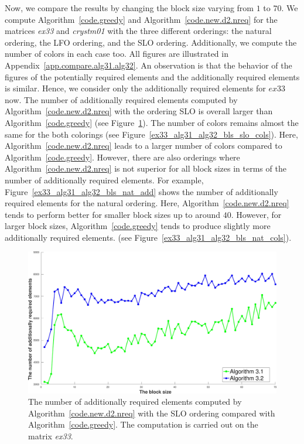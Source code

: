 \documentclass[12pt, twoside,a4paper,toc=bibliography]{scrbook}
\newcommand{\figref}[1]{Figure~\protect\ref{#1}}
\newcommand{\coderef}[1]{Algorithm~\protect\ref{#1}}
\newcommand{\appref}[1]{Appendix~\protect\ref{#1}}
\begin{document}
Now, we compare the results by changing the block size varying from $1$ to $70$.
We compute \coderef{code.greedy} and \coderef{code.new.d2.nreq} for the matrices \textit{ex33}
and \textit{crystm01} with the three different orderings: the natural ordering, the LFO ordering,
and the SLO ordering. Additionally, we compute the number of colors in each case too.
All figures are illustrated in \appref{app.compare.alg31.alg32}.
An observation is that the behavior of the figures of the potentially required elements and
the additionally required elements is similar. Hence, we consider only the additionally
required elements for $ex33$ now.
The number of additionally required elements computed by \coderef{code.new.d2.nreq} with the ordering SLO
is overall larger than \coderef{code.greedy} (see \figref{ex33_alg31_alg32_bls_slo_add}).
The number of colors remains almost the same for the both colorings
(see \figref{ex33_alg31_alg32_bls_slo_cols}).
Here, \coderef{code.new.d2.nreq} leads to a larger number of colors compared to \coderef{code.greedy}.
However, there are also orderings where \coderef{code.new.d2.nreq} is not superior for all block sizes in terms of 
the number of additionally required elements.
For example, \figref{ex33_alg31_alg32_bls_nat_add} shows the number of additionally required elements
for the natural ordering.
Here, \coderef{code.new.d2.nreq} tends to perform better for smaller block sizes up to around $40$.
However, for larger block sizes, \coderef{code.greedy} tends to produce slightly more additionally required elements.
(see \figref{ex33_alg31_alg32_bls_nat_cols}).

\begin{figure}
\centering
\includegraphics[width=0.9\linewidth]{ex33_alg31_alg32_bls_slo_add}
\caption{
The number of additionally required elements computed by
\coderef{code.new.d2.nreq} with the SLO ordering
compared with \coderef{code.greedy}.
The computation is carried out on the matrix \textit{ex33}. }
\label{ex33_alg31_alg32_bls_slo_add}
\end{figure}
\end{document}
